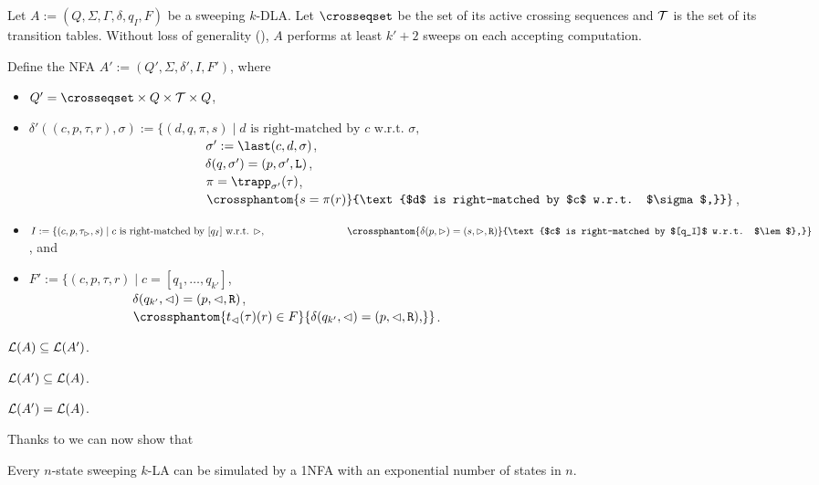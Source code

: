 Let $A:=(Q,\Sigma,\Gamma,\delta,q_I,F)$ be a sweeping $k$-DLA.
Let $\crosseqset$ be the set of its active crossing sequences and $\mathcal T$ is the set of its transition tables.
Without loss of generality (), $A$ performs at least $k'+2$ sweeps on each accepting computation.

Define the NFA $A':=(Q',\Sigma,\delta',I,F')$, where
\begin{itemize}
	\item $Q'=\crosseqset\times Q\times\transtabset\times Q$,
	\item $\delta'((c,p,\tau,r),\sigma):=\{(d,q,\pi,s) \mid \text{$d$ is right-matched by $c$ w.r.t. $\sigma$,}$\\
	      \newcommand{\phant}{\phantom{\delta'((c,p,\tau,r),\sigma):=\{(d,q,\pi,s) \mid ~}}
	      $\phant \sigma':=\last(c,d,\sigma)$, \\
	      $\phant \delta(q,\sigma')=(p,\sigma',\tl)$, \\
	      $\phant \pi=\trapp_{\sigma'}(\tau)$, \\
	      $\phant \crossphantom{s=\pi(r)}{\text{$d$ is right-matched by $c$ w.r.t. $\sigma$,}}\}$,
	\item $I:=\{(c,p,\tau_\lem,s) \mid \text{$c$ is right-matched by $[q_I]$ w.r.t. $\lem$},\\
		      \phantom{I:=\{(c,p,\tau_\lem,s) \mid~} \crossphantom{\delta(p,\lem)=(s,\lem,\tr)}{\text{$c$ is right-matched by $[q_I]$ w.r.t. $\lem$},}\}$, and
	\item $F':=\{(c,p,\tau,r) \mid c=[q_1,\dots,q_{k'}]$, \\
	      \renewcommand{\phant}{\phantom{F':=\{(c,p,\tau,r) \mid ~}}
	      $\phant \delta(q_{k'},\rem)=(p,\rem,\tr)$, \\
	      $\phant \crossphantom{t_\rem(\tau)(r)\in F}{\delta(q_{k'},\rem)=(p,\rem,\tr)\text,}\}$.
\end{itemize}

\begin{lemm}\label{lem:swkLAtoNFA-1}
	$\mathcal L(A)\subseteq\mathcal L(A')$.
\end{lemm}

\begin{lemm}\label{lem:swkLAtoNFA-2}
	$\mathcal L(A')\subseteq\mathcal L(A)$.
\end{lemm}

\begin{thrm}\label{thm:swkLAtoNFA}
	$\mathcal L(A')=\mathcal L(A)$.
\end{thrm}

Thanks to  we can now show that
\begin{thrm}
	Every $n$-state sweeping $k$-LA can be simulated by a 1NFA with an exponential number of states in $n$.
\end{thrm}
